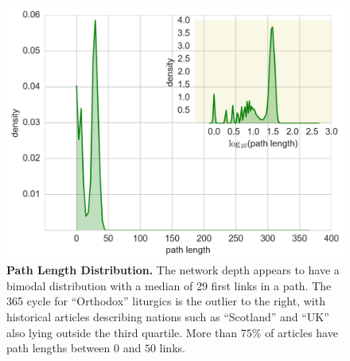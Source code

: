 \documentclass[pre,twocolumn,twoside,superscriptaddress,floatfix]{revtex4-1}
\begin{document}
{\begin{figure}[tp!]
  \includegraphics[width=\columnwidth]{path_lengths_dist.pdf}
  \caption{
    \textbf{Path Length Distribution.}
The network depth appears to have a bimodal distribution with a median of 29 first links in a path.
The 365 cycle for ``Orthodox'' liturgics is the outlier to the right, with historical articles 
describing nations such as ``Scotland'' and ``UK'' also lying outside the third quartile.
More than $75\%$ of articles have path lengths between 
$0$ and $50$ links.}
  \label{fig:Path Length Distribution}
\end{figure}

}
\end{document}
